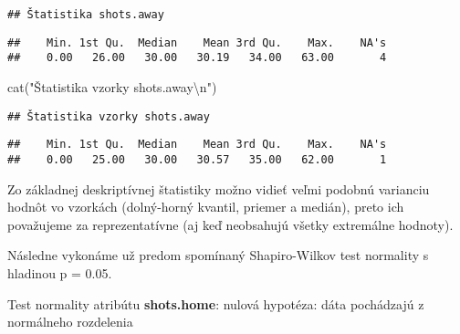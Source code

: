 \documentclass[
]{article}
\newenvironment{Shaded}{\begin{snugshade}}{\end{snugshade}}
\newcommand{\FunctionTok}[1]{\textcolor[rgb]{0.00,0.00,0.00}{#1}}
\newcommand{\NormalTok}[1]{#1}
\newcommand{\SpecialCharTok}[1]{\textcolor[rgb]{0.00,0.00,0.00}{#1}}
\newcommand{\StringTok}[1]{\textcolor[rgb]{0.31,0.60,0.02}{#1}}
\begin{document}
\begin{verbatim}
## Štatistika shots.away
\end{verbatim}

\begin{Shaded}
\end{Shaded}

\begin{verbatim}
##    Min. 1st Qu.  Median    Mean 3rd Qu.    Max.    NA's 
##    0.00   26.00   30.00   30.19   34.00   63.00       4
\end{verbatim}

\begin{Shaded}
\begin{Highlighting}[]
\FunctionTok{cat}\NormalTok{(}\StringTok{"Štatistika vzorky shots.away}\SpecialCharTok{\textbackslash{}n}\StringTok{"}\NormalTok{)}
\end{Highlighting}
\end{Shaded}

\begin{verbatim}
## Štatistika vzorky shots.away
\end{verbatim}

\begin{Shaded}
\end{Shaded}

\begin{verbatim}
##    Min. 1st Qu.  Median    Mean 3rd Qu.    Max.    NA's 
##    0.00   25.00   30.00   30.57   35.00   62.00       1
\end{verbatim}

Zo základnej deskriptívnej štatistiky možno vidieť veľmi podobnú
varianciu hodnôt vo vzorkách (dolný-horný kvantil, priemer a medián),
preto ich považujeme za reprezentatívne (aj keď neobsahujú všetky
extremálne hodnoty).

Následne vykonáme už predom spomínaný Shapiro-Wilkov test normality s
hladinou p = 0.05.

Test normality atribútu \textbf{shots.home}: nulová hypotéza: dáta
pochádzajú z normálneho rozdelenia

\begin{Shaded}
\end{Shaded}
\end{document}
